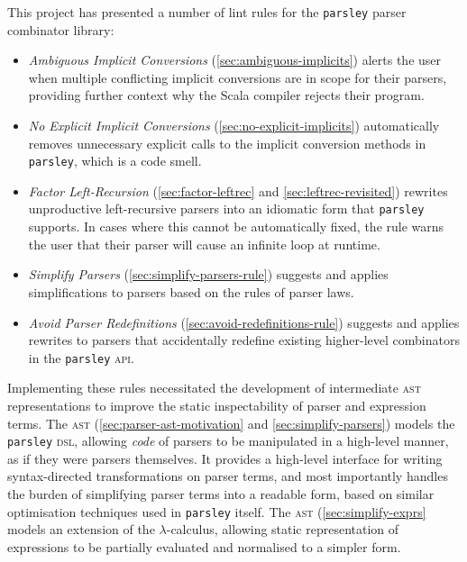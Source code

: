 \documentclass[../../main.tex]{subfiles}
\begin{document}
This project has presented a number of lint rules for the \texttt{parsley} parser combinator library:
\begin{itemize}
  \item \emph{Ambiguous Implicit Conversions} (\cref{sec:ambiguous-implicits}) alerts the user when multiple conflicting implicit conversions are in scope for their parsers, providing further context why the Scala compiler rejects their program.
  \item \emph{No Explicit Implicit Conversions} (\cref{sec:no-explicit-implicits}) automatically removes unnecessary explicit calls to the implicit conversion methods in \texttt{parsley}, which is a code smell.
  \item \emph{Factor Left-Recursion} (\cref{sec:factor-leftrec} and \cref{sec:leftrec-revisited}) rewrites unproductive left-recursive parsers into an idiomatic form that \texttt{parsley} supports. In cases where this cannot be automatically fixed, the rule warns the user that their parser will cause an infinite loop at runtime.
  \item \emph{Simplify Parsers} (\cref{sec:simplify-parsers-rule}) suggests and applies simplifications to parsers based on the rules of parser laws.
  \item \emph{Avoid Parser Redefinitions} (\cref{sec:avoid-redefinitions-rule}) suggests and applies rewrites to parsers that accidentally redefine existing higher-level combinators in the \texttt{parsley} \textsc{api}.
\end{itemize}
%
Implementing these rules necessitated the development of intermediate \textsc{ast} representations to improve the static inspectability of parser and expression terms.
The  \textsc{ast} (\cref{sec:parser-ast-motivation} and \cref{sec:simplify-parsers}) models the \texttt{parsley} \textsc{dsl}, allowing \emph{code} of parsers to be manipulated in a high-level manner, as if they were parsers themselves.
It provides a high-level interface for writing syntax-directed transformations on parser terms, and most importantly handles the burden of simplifying parser terms into a readable form, based on similar optimisation techniques used in \texttt{parsley} itself.
The  \textsc{ast} (\cref{sec:simplify-exprs} models an extension of the $\lambda$-calculus, allowing static representation of expressions to be partially evaluated and normalised to a simpler form.
\end{document}
